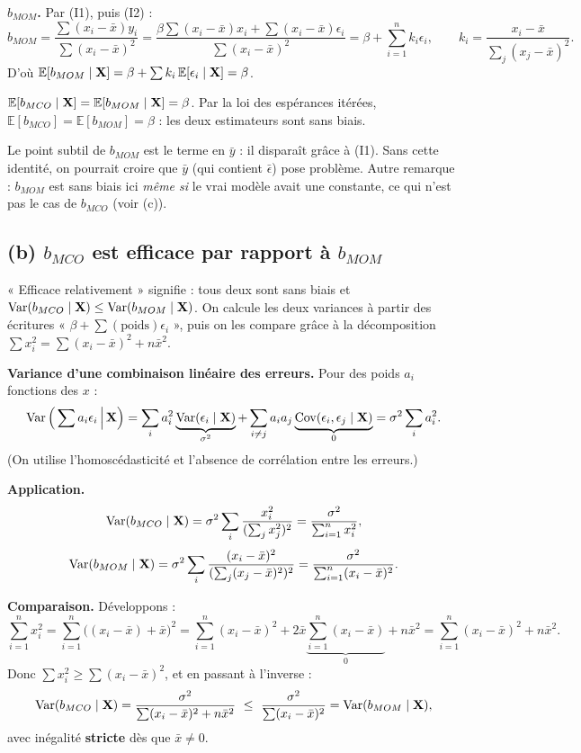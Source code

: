 \documentclass[11pt,a4paper]{article}
\newcommand{\E}{\mathbb{E}}\newcommand{\Var}{\operatorname{Var}}\newcommand{\Cov}{\operatorname{Cov}}
\newcommand{\sumi}{\sum_{i=1}^{n}}
\begin{document}
\textbf{$b_{MOM}$.} Par (I1), puis (I2) :
\[
b_{MOM}=\frac{\sum(x_i-\bar x)y_i}{\sum(x_i-\bar x)^2}
=\frac{\beta\sum(x_i-\bar x)x_i+\sum(x_i-\bar x)\epsilon_i}{\sum(x_i-\bar x)^2}
=\beta+\sumi k_i\epsilon_i,\qquad k_i=\frac{x_i-\bar x}{\sum_j(x_j-\bar x)^2}.
\]
D'où $\E[b_{MOM}\mid\vX]=\beta+\sum k_i\,\E[\epsilon_i\mid\vX]=\beta$.

\begin{reponse}
$\E[b_{MCO}\mid\vX]=\E[b_{MOM}\mid\vX]=\beta$. Par la loi des espérances itérées, $\E[b_{MCO}]=\E[b_{MOM}]=\beta$ : les deux estimateurs sont sans biais.
\end{reponse}

\begin{attention}
Le point subtil de $b_{MOM}$ est le terme en $\bar y$ : il disparaît grâce à (I1). Sans cette identité, on pourrait croire que $\bar y$ (qui contient $\bar\epsilon$) pose problème. Autre remarque : $b_{MOM}$ est sans biais ici \emph{même si} le vrai modèle avait une constante, ce qui n'est pas le cas de $b_{MCO}$ (voir (c)).
\end{attention}

\subsection{(b) $b_{MCO}$ est efficace par rapport à $b_{MOM}$}

\begin{idee}
« Efficace relativement » signifie : tous deux sont sans biais et $\Var(b_{MCO}\mid\vX)\le\Var(b_{MOM}\mid\vX)$. On calcule les deux variances à partir des écritures « $\beta+\sum(\text{poids})\epsilon_i$ », puis on les compare grâce à la décomposition $\sum x_i^2=\sum(x_i-\bar x)^2+n\bar x^2$.
\end{idee}

\textbf{Variance d'une combinaison linéaire des erreurs.} Pour des poids $a_i$ fonctions des $x$ :
\[
\Var\Big(\sum a_i\epsilon_i\,\Big|\,\vX\Big)=\sum_i a_i^2\underbrace{\Var(\epsilon_i\mid\vX)}_{\sigma^2}+\sum_{i\ne j}a_ia_j\underbrace{\Cov(\epsilon_i,\epsilon_j\mid\vX)}_{0}=\sigma^2\sum_i a_i^2 .
\]
(On utilise l'homoscédasticité et l'absence de corrélation entre les erreurs.)

\textbf{Application.}
\[
\Var(b_{MCO}\mid\vX)=\sigma^2\sum_i\frac{x_i^2}{(\sum_j x_j^2)^2}=\frac{\sigma^2}{\sumi x_i^2},
\]
\[
\Var(b_{MOM}\mid\vX)=\sigma^2\sum_i\frac{(x_i-\bar x)^2}{(\sum_j(x_j-\bar x)^2)^2}=\frac{\sigma^2}{\sumi(x_i-\bar x)^2}.
\]

\textbf{Comparaison.} Développons :
\[
\sumi x_i^2=\sumi\big((x_i-\bar x)+\bar x\big)^2=\sumi(x_i-\bar x)^2+2\bar x\underbrace{\sumi(x_i-\bar x)}_{0}+n\bar x^2=\sumi(x_i-\bar x)^2+n\bar x^2 .
\]
Donc $\sum x_i^2\ge\sum(x_i-\bar x)^2$, et en passant à l'inverse :
\[
\Var(b_{MCO}\mid\vX)=\frac{\sigma^2}{\sum(x_i-\bar x)^2+n\bar x^2}\ \le\ \frac{\sigma^2}{\sum(x_i-\bar x)^2}=\Var(b_{MOM}\mid\vX),
\]
avec inégalité \textbf{stricte} dès que $\bar x\ne0$.
\end{document}
